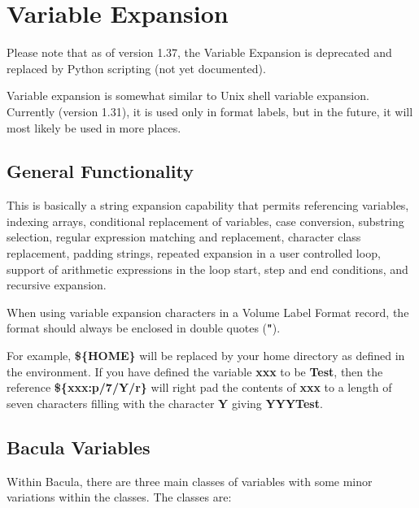 
\chapter{Variable Expansion}
\label{VarsChapter}


Please note that as of version 1.37, the Variable Expansion 
is deprecated and replaced by Python scripting (not yet
documented).

Variable expansion is somewhat similar to Unix shell variable expansion.
Currently (version 1.31), it is used only in format labels, but in the future,
it will most likely be used in more places. 

\section{General Functionality}

This is basically a string expansion capability that permits referencing
variables, indexing arrays, conditional replacement of variables, case
conversion, substring selection, regular expression matching and replacement,
character class replacement, padding strings, repeated expansion in a user
controlled loop, support of arithmetic expressions in the loop start, step and
end conditions, and recursive expansion. 

When using variable expansion characters in a Volume Label Format record, the
format should always be enclosed in double quotes ({\bf "}). 

For example, {\bf \$\{HOME\}} will be replaced by your home directory as
defined in the environment. If you have defined the variable {\bf xxx} to be
{\bf Test}, then the reference {\bf \$\{xxx:p/7/Y/r\}} will right pad the
contents of {\bf xxx} to a length of seven characters filling with the
character {\bf Y} giving {\bf YYYTest}. 

\section{Bacula Variables}

Within Bacula, there are three main classes of variables with some minor
variations within the classes. The classes are: 

